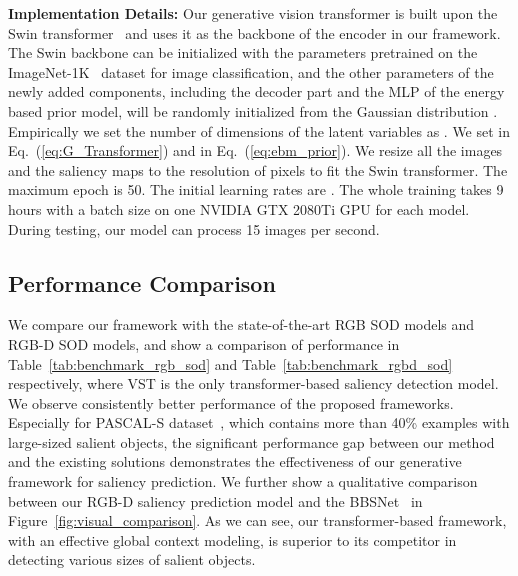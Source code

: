 \documentclass{article}
\begin{document}
\noindent\textbf{Implementation Details:}
Our generative vision transformer is built upon the Swin transformer~\cite{liu2021swin}  and uses it as the backbone of the encoder in our framework. The Swin backbone can be initialized with the parameters pretrained on the ImageNet-1K~\cite{imagenet_1k} dataset for image classification, and the other parameters of the newly added components, including the decoder part and the MLP of the energy based prior model, will be randomly initialized from the Gaussian distribution .
Empirically we set the number of dimensions  of the latent variables  as . We set  in Eq.~(\ref{eq:G_Transformer})  and  in Eq.~(\ref{eq:ebm_prior}). 
We resize all the images and the saliency maps to the resolution of  pixels to fit the Swin transformer. The maximum epoch is 50. The initial learning rates are . The whole training takes 9 hours with a batch size  on one NVIDIA GTX 2080Ti GPU for each model.
During testing, our model can process 15 images per second.














\subsection{Performance Comparison}


We compare our framework with the state-of-the-art RGB SOD models and RGB-D SOD models, and show a comparison of performance in Table~\ref{tab:benchmark_rgb_sod} and Table~\ref{tab:benchmark_rgbd_sod} respectively, where VST \cite{Liu_2021_ICCV_VST} is the only transformer-based saliency detection model.
We observe consistently better performance of the proposed frameworks. Especially for PASCAL-S dataset~\cite{pascal_s_dataset}, which contains more than 40\% examples with large-sized salient objects, the significant performance gap between our method and the existing solutions demonstrates the effectiveness of our generative framework for saliency prediction.
We further show a qualitative comparison between our RGB-D saliency prediction model and the BBSNet~\cite{fan2020bbs} in Figure~\ref{fig:visual_comparison}. As we can see, our transformer-based framework, with an effective global context modeling, is superior to its competitor in detecting various sizes of salient objects. 
\end{document}
